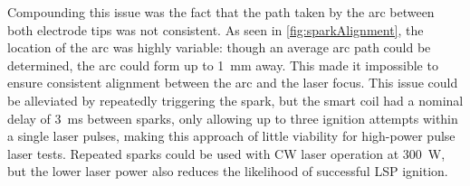             Compounding this issue was the fact that the path taken by the arc between both electrode tips was not consistent. As seen in \autoref{fig:sparkAlignment}, the location of the arc was highly variable: though an average arc path could be determined, the arc could form up to \qty{1}{mm} away. This made it impossible to ensure consistent alignment between the arc and the laser focus. This issue could be alleviated by repeatedly triggering the spark, but the smart coil had a nominal delay of \qty{3}{ms} between sparks, only allowing up to three ignition attempts within a single laser pulses, making this approach of little viability for high-power pulse laser tests. Repeated sparks could be used with CW laser operation at \qty{300}{W}, but the lower laser power also reduces the likelihood of successful LSP ignition.

